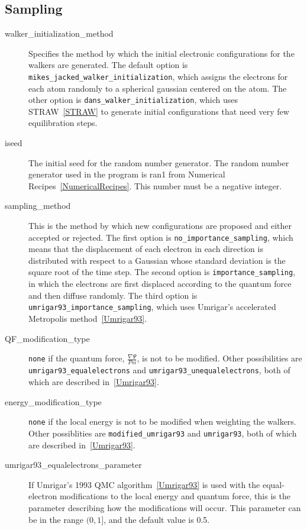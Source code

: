 \documentclass{article}
\begin{document}
\subsection{Sampling}

\begin{description}

\item [walker\_initialization\_method] Specifies the method by which the
  initial electronic configurations for the walkers are generated.
  The default option is \verb-mikes_jacked_walker_initialization-, which
  assigns the electrons for each atom randomly to a spherical gaussian
  centered on the atom.  The other option is
  \verb-dans_walker_initialization-, which uses STRAW~\ref{STRAW} to
  generate initial configurations that need very few equilibration
  steps.

\item [iseed] The initial seed for the random number generator.
  The random number generator used in the program is ran1 from
  Numerical Recipes~\ref{NumericalRecipes}.  This number must be a
  negative integer.

\item [sampling\_method] This is the method by which new configurations
  are proposed and either accepted or rejected.  The first option is
  \verb-no_importance_sampling-, which means that the displacement of
  each electron in each direction is distributed with respect to a
  Gaussian whose standard deviation is the square root of the time
  step.  The second option is \verb-importance_sampling-, in which the
  electrons are first displaced according to the quantum force and
  then diffuse randomly.  The third option is
  \verb-umrigar93_importance_sampling-, which uses Umrigar's
  accelerated Metropolis method~\ref{Umrigar93}.  

\item [QF\_modification\_type] \verb-none- if the quantum force,
  $\frac{\nabla \Psi}{Psi}$, is not to be modified.  Other
  possibilities are \verb-umrigar93_equalelectrons- and
  \verb-umrigar93_unequalelectrons-, both of which are described
  in~\ref{Umrigar93}.  

\item [energy\_modification\_type] \verb-none- if the local energy
  is not to be modified when weighting the walkers.  Other
  possiblities are \verb-modified_umrigar93- and \verb-umrigar93-,
  both of which are described in~\ref{Umrigar93}.

\item [umrigar93\_equalelectrons\_parameter] If Umrigar's 1993 QMC
  algorithm~\ref{Umrigar93} is used with the equal-electron
  modifications to the local energy and quantum force, this is the
  parameter describing how the modifications will occur.  This
  parameter can be in the range $(0,1]$, and the default value is 0.5.


\end{description}
\end{document}
